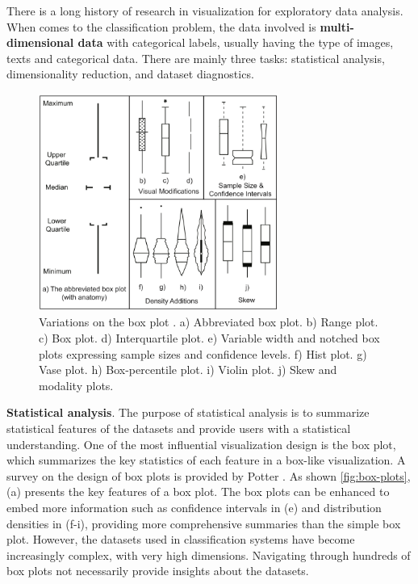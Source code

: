 There is a long history of research in visualization for exploratory data analysis. When comes to the classification problem, the data involved is \textbf{multi-dimensional data} with categorical labels, usually having the type of images, texts and categorical data. There are mainly three tasks: statistical analysis, dimensionality reduction, and dataset diagnostics.

\begin{figure}[hbt]
    \centering
    \includegraphics[width=0.7\textwidth]{figure/box-plots}
    \caption{Variations on the box plot \cite{potter2010statistics}. a) Abbreviated box plot. b) Range plot. c) Box plot. d) Interquartile plot. e) Variable width and notched box plots expressing sample sizes and confidence levels. f) Hist plot. g) Vase plot. h) Box-percentile plot. i) Violin plot. j) Skew and modality plots.}
    \label{fig:box-plots}
\end{figure}

\textbf{Statistical analysis}. The purpose of statistical analysis is to summarize statistical features of the datasets and provide users with a statistical understanding. One of the most influential visualization design is the box plot, which summarizes the key statistics of each feature in a box-like visualization. A survey on the design of box plots is provided by Potter \etal \cite{potter2010statistics}. As shown \autoref{fig:box-plots}, (a) presents the key features of a box plot. The box plots can be enhanced to embed more information such as confidence intervals in (e) and distribution densities in (f-i), providing more comprehensive summaries than the simple box plot. However, the datasets used in classification systems have become increasingly complex, with very high dimensions. Navigating through hundreds of box plots not necessarily provide insights about the datasets.

